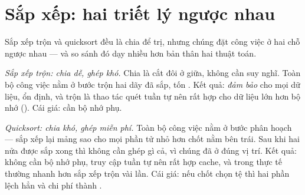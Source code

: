 \documentclass[../../algorithm.tex]{subfiles}
\begin{document}
\section{Sắp xếp: hai triết lý ngược nhau}

Sắp xếp trộn và quicksort đều là chia để trị, nhưng chúng đặt công việc ở hai chỗ ngược nhau --- và so sánh đó dạy nhiều hơn bản thân hai thuật toán.

\emph{Sắp xếp trộn: chia dễ, ghép khó.} Chia là cắt đôi ở giữa, không cần suy nghĩ. Toàn bộ công việc nằm ở bước trộn hai dãy đã sắp, tốn . Kết quả:  \emph{đảm bảo} cho mọi dữ liệu, ổn định, và trộn là thao tác quét tuần tự nên rất hợp cho dữ liệu lớn hơn bộ nhớ (). Cái giá: cần  bộ nhớ phụ.

\emph{Quicksort: chia khó, ghép miễn phí.} Toàn bộ công việc nằm ở bước phân hoạch --- sắp xếp lại mảng sao cho mọi phần tử nhỏ hơn chốt nằm bên trái. Sau khi hai nửa được sắp xong thì không cần ghép gì cả, vì chúng đã ở đúng vị trí. Kết quả: không cần bộ nhớ phụ, truy cập tuần tự nên rất hợp cache, và trong thực tế thường nhanh hơn sắp xếp trộn vài lần. Cái giá: nếu chốt chọn tệ thì hai phần lệch hẳn và chi phí thành .
\end{document}
